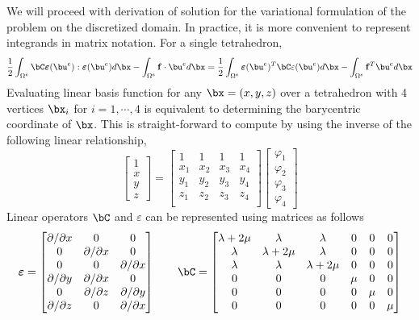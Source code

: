 \documentclass[11pt,titlepage]{article}
\newcommand{\bepsilon}{\boldsymbol{\varepsilon}}
\renewcommand{\epsilon}{\varepsilon}
\renewcommand{\bf}{\mathbf{f}}
\begin{document}
We will proceed with derivation of solution for the variational formulation of the problem on the discretized domain. In practice, it is more convenient to represent integrands in matrix notation. For a single tetrahedron,
\[
    \frac{1}{2}\int_{\Omega^e} \bC \bepsilon(\bu^e) : \bepsilon(\bu^e) d\bx 
    - \int_{\Omega^e} \bf \cdot\bu^e d\bx
    =
    \frac{1}{2} \int_{\Omega^e} \bepsilon(\bu^e)^T \bC \epsilon(\bu^e) d\bx
    - \int_{\Omega^e} \bf^T \bu^e d\bx
\]
Evaluating linear basis function for any $\bx = (x,y,z)$ over a tetrahedron with 4 vertices $\bx_i$ for $i=1,\cdots,4$ is equivalent to determining the barycentric coordinate of $\bx$. This is straight-forward to compute by using the inverse of the following linear relationship, 
\[
    \begin{bmatrix}
        1 \\ x \\ y \\ z 
    \end{bmatrix}
    = 
    \begin{bmatrix}
        1 & 1 & 1 & 1 \\
        x_1 & x_2 & x_3 & x_4 \\
        y_1 & y_2 & y_3 & y_4 \\
        z_1 & z_2 & z_3 & z_4 \\
    \end{bmatrix}
    \begin{bmatrix}
        \varphi_1 \\ \varphi_2 \\ \varphi_3 \\ \varphi_4
    \end{bmatrix}
\]
Linear operators $\bC$ and $\epsilon$ can be represented using matrices as follows 
\[
    \bepsilon = 
    \begin{bmatrix}
        \partial / \partial x & 0 & 0 \\
        0 & \partial / \partial x & 0 \\
        0 & 0 & \partial / \partial x \\
        \partial / \partial y & \partial /\partial x & 0 \\
        0 & \partial / \partial z & \partial /\partial y \\
        \partial / \partial z & 0 & \partial /\partial x \\
    \end{bmatrix}
    \quad\quad
    \bC = 
    \begin{bmatrix}
        \lambda + 2\mu & \lambda & \lambda & 0 & 0 & 0 \\
        \lambda & \lambda + 2\mu & \lambda & 0 & 0 & 0 \\
        \lambda & \lambda & \lambda + 2\mu & 0 & 0 & 0 \\
        0 & 0 & 0 & \mu & 0 & 0 \\
        0 & 0 & 0 & 0 & \mu & 0 \\
        0 & 0 & 0 & 0 & 0 & \mu \\
    \end{bmatrix}
\]
\end{document}

